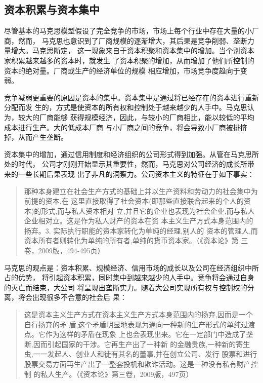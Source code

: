 \subsection{资本积累与资本集中}

尽管基本的马克思模型假设了完全竞争的市场，市场上每个行业中存在大量的小厂商，然而，
马克思也意识到了厂商规模的逐渐增大，其后果是竞争削弱、垄断力量增大。马克思断定，
这一现象来自于资本积聚和资本集中的增加。当个别资本家积累越来越多的资本时，就发生
了资本积聚的增加，从而增加了他们所控制的资本的绝对量。厂商或生产的经济单位的规模
相应增加，市场竞争度趋向于变弱。

竞争减弱更重要的原因是资本的集中。资本集中是通过将已经存在的资本进行重新分配而发
生的，方式是使资本的所有权和控制处于越来越少的人手中。马克思认为，较大的厂商能够
获得规模经济，因此，与较小的厂商相比，能以较低的平均成本进行生产。大的低成本厂商
与小厂商之间的竞争，将会导致小厂商被排挤掉，从而产生垄断。

资本集中的增加，通过信用制度和经济组织的公司形式得到加强。从管在马克思所处的时代，
公司才刚刚开始显示其重要性，然而，马克思对公司经济的成长所带来的一些长期后果表现
出了非凡的洞察力。公司资本主义的特征在于如下事实：
\begin{quotation}
  那种本身建立在社会生产方式的基础上并以生产资料和劳动力的社会集中为前提的资本,在
  这里直接取得了社会资本(即那些直接联合起来的个人的资本)的形式,而与私人资本相对
  立,并且它的企业也表现为社会企业,而与私人企业相对立。这是作为私人财产的资本在资
  本主义生产方式本身范围内的扬弃。3. 实际执行职能的资本家转化为单纯的经理,别人的
  资本的管理人,而资本所有者则转化为单纯的所有者,单纯的货币资本家。（《资本论》第
  三卷，2009版，494-495页）
\end{quotation}

马克思的观点是：资本积累、规模经济、信用市场的成长以及公司在经济组织中所占的优势，
将引起资本积累，同时集中到越来越少的人手中。竞争将会通过自身的灭亡而结束，大公司
将呈现出垄断实力。随着大公司实现所有权与控制权的分离，将会出现很多不合意的社会后
果：
\begin{quotation}
  这是资本主义生产方式在资本主义生产方式本身范围内的扬弃,因而是一个自行扬弃的矛
  盾,这个矛盾明显地表现为通向一种新的生产形式的单纯过渡点。它作为这样的矛盾在现象
  上也会表现出来。它在一定部门中造成了垄断,因而引起国家的干涉。它再生产出了一种新
  的金融贵族,一种新的寄生虫,一一发起人、创业人和徒有其名的董事,并在创立公司、发行
  股票和进行股票交易方面再生产出了一整套投机和欺诈活动。这是一种没有私有财产控制
  的私人生产。（《资本论》第三卷，2009版，497页）
\end{quotation}

